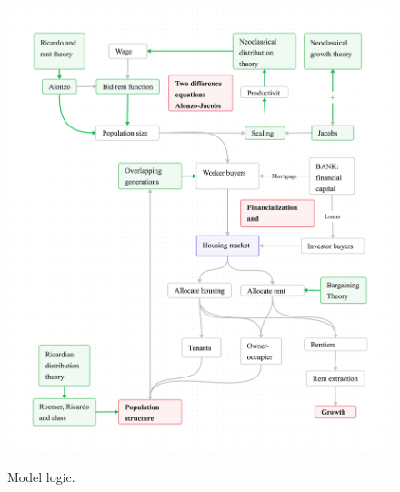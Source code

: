 {\newpage\thispagestyle{empty}
\vspace{-1.5cm}
\begin{figure}
\vspace{-3.5cm}
\begin{adjustwidth}{-0.24\textwidth}{-0.24\textwidth}
\centering
\includegraphics[scale=.2]{fig/flow_full_model.png}%
\label{Stylized model flow.}
\end{adjustwidth}
\caption[Model logic]{Model logic.}\label{fig-flow-full-model}
\end{figure}
}


